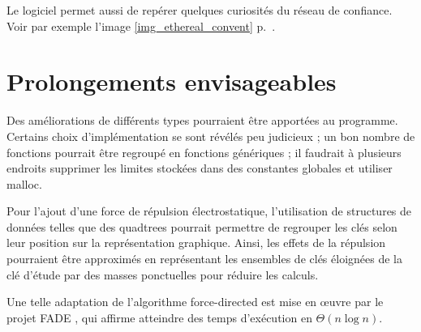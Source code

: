 \documentclass[a4paper]{article}
\begin{document}
Le logiciel permet aussi de repérer quelques curiosités du réseau de confiance. Voir par exemple l'image \ref{img_ethereal_convent} p.~\pageref{img_ethereal_convent}.

\section{Prolongements envisageables}

Des améliorations de différents types pourraient être apportées au programme. Certains choix d'implémentation se sont révélés peu judicieux ; un bon nombre de fonctions pourrait être regroupé en fonctions génériques ; il faudrait à plusieurs endroits supprimer les limites stockées dans des constantes globales et utiliser malloc.

Pour l'ajout d'une force de répulsion électrostatique, l'utilisation de structures de données telles que des quadtrees pourrait permettre de regrouper les clés selon leur position sur la représentation graphique. Ainsi, les effets de la répulsion pourraient être approximés en représentant les ensembles de clés éloignées de la clé d'étude par des masses ponctuelles pour réduire les calculs.

Une telle adaptation de l'algorithme force-directed est mise en œuvre par le projet FADE \cite{FADE}, qui affirme atteindre des temps d'exécution en $\Theta(n \log n)$.

\pagebreak
\end{document}
